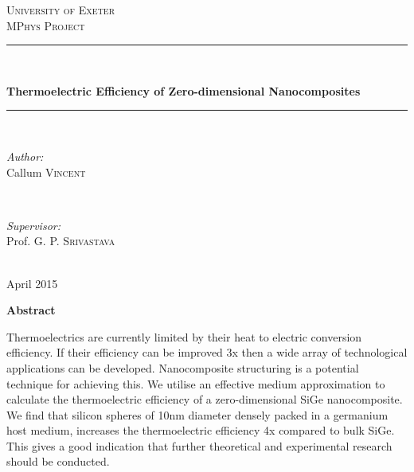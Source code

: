 \documentclass[12pt]{article}
\newcommand{\tms}{\textsf{x} }
\begin{document}

\pagestyle{empty}

\begin{titlepage}
\center
\textsc{\huge University of Exeter}\\[1cm]
\textsc{\Large MPhys Project}\\[1.5cm]

\rule{\linewidth}{0.5mm}\\[0.4cm]
\begin{doublespace}
{\LARGE \textbf{Thermoelectric Efficiency of Zero-dimensional Nanocomposites}}\\[0cm]
\end{doublespace}
\rule{\linewidth}{0.5mm}\\[2.5cm]
 
\begin{minipage}{0.4\textwidth}
\begin{flushleft} \large
\emph{Author:}\\
Callum \textsc{Vincent}
\end{flushleft}
\end{minipage}
~
\begin{minipage}{0.4\textwidth}
\begin{flushright} \large
\emph{Supervisor:} \\
Prof. G. P. \textsc{Srivastava}
\end{flushright}
\end{minipage}\\[4cm]

{\large April 2015}

\pagedecorationleft
\pagedecorationright
\end{titlepage}

\begin{center}
{\Huge\textbf{Abstract}}\\[2cm]
\end{center}
\begin{justify}
Thermoelectrics are currently limited by their heat to electric conversion efficiency. If their efficiency can be improved 3\tms then a wide array of technological applications can be developed. Nanocomposite structuring is a potential technique for achieving this. We utilise an effective medium approximation to calculate the thermoelectric efficiency of a zero-dimensional SiGe nanocomposite. We find that silicon spheres of 10nm diameter densely packed in a germanium host medium, increases the thermoelectric efficiency 4\tms compared to bulk SiGe. This gives a good indication that further theoretical and experimental research should be conducted.
\end{justify}
\end{document}
